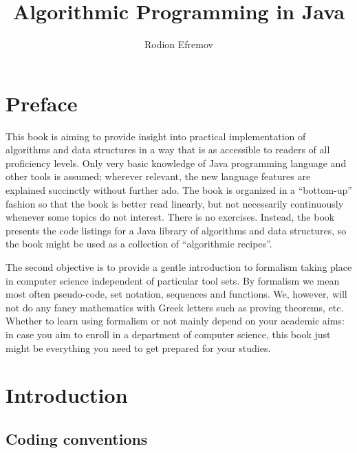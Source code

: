 \documentclass{book}
\title{Algorithmic Programming in Java}
\author{Rodion Efremov}
\begin{document}
\maketitle

\part*{Preface}
This book is aiming to provide insight into practical implementation of algorithms and data structures in a way that is as accessible to readers of all proficiency levels. Only very basic knowledge of Java programming language and other tools is assumed; wherever relevant, the new language features are explained succinctly without further ado. The book is organized in a ``bottom-up'' fashion so that the book is better read linearly, but not necessarily continuously whenever some topics do not interest. There is no exercises. Instead, the book presents the code listings for a Java library of algorithms and data structures, so the book might be used as a collection of ``algorithmic recipes''. 

The second objective is to provide a gentle introduction to formalism taking place in computer science independent of particular tool sets. By formalism we mean most often pseudo-code, set notation, sequences and functions. We, however, will not do any fancy mathematics with Greek letters such as proving theorems, etc. Whether to learn using formalism or not mainly depend on your academic aims: in case you aim to enroll in a department of computer science, this book just might be everything you need to get prepared for your studies.

\part{Introduction}

\chapter{Coding conventions}
\end{document}
